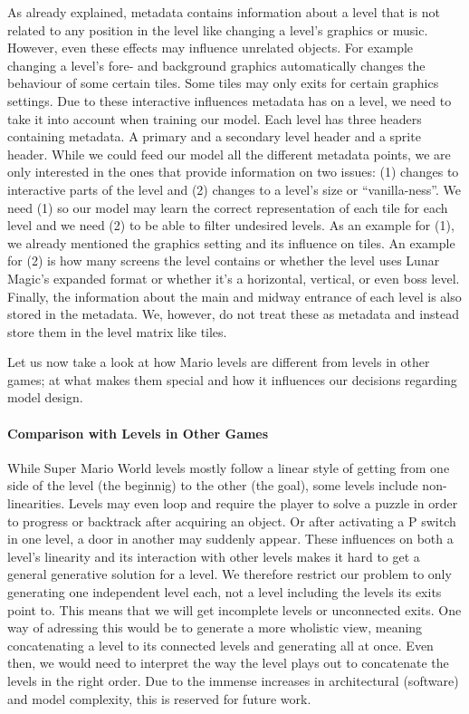 As already explained, metadata contains information about a level that
is not related to any position in the level like changing a level's
graphics or music. However, even these effects may influence unrelated
objects. For example changing a level's fore- and background graphics
automatically changes the behaviour of some certain tiles. Some tiles
may only exits for certain graphics settings. Due to these interactive
influences metadata has on a level, we need to take it into account
when training our model. Each level has three headers containing
metadata. A primary and a secondary level header and a sprite header.
While we could feed our model all the different metadata points, we
are only interested in the ones that provide information on two
issues: (1) changes to interactive parts of the level and (2) changes
to a level's size or ``vanilla-ness''. We need (1) so our model may
learn the correct representation of each tile for each level and we
need (2) to be able to filter undesired levels. As an example for (1),
we already mentioned the graphics setting and its influence on tiles.
An example for (2) is how many screens the level contains or whether
the level uses Lunar Magic's expanded format or whether it's a
horizontal, vertical, or even boss level. \\
Finally, the information about the main and midway entrance of each
level is also stored in the metadata. We, however, do not treat these
as metadata and instead store them in the level matrix like tiles.

Let us now take a look at how Mario levels are different from levels
in other games; at what makes them special and how it influences our
decisions regarding model design.

\paragraph{Comparison with Levels in Other Games}

While Super Mario World levels mostly follow a linear style of getting
from one side of the level (the beginnig) to the other (the goal),
some levels include non-linearities. Levels may even loop and require
the player to solve a puzzle in order to progress or backtrack after
acquiring an object. Or after activating a P switch in one level, a
door in another may suddenly appear. These influences on both a
level's linearity and its interaction with other levels makes it hard
to get a general generative solution for a level. We therefore
restrict our problem to only generating one independent level each,
not a level including the levels its exits point to. This means that
we will get incomplete levels or unconnected exits. One way of
adressing this would be to generate a more wholistic view, meaning
concatenating a level to its connected levels and generating all at
once. Even then, we would need to interpret the way the level plays
out to concatenate the levels in the right order. Due to the immense
increases in architectural (software) and model complexity, this is
reserved for future work.

